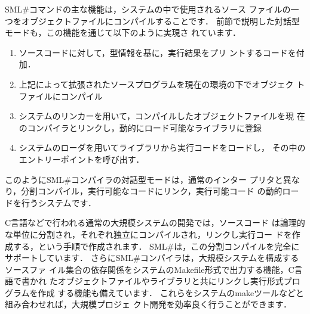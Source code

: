 \documentclass{jbook}
\newcommand{\smlsharp}{SML\#}
\begin{document}
	\smlsharp{}コマンドの主な機能は，システムの中で使用されるソース
ファイルの一つをオブジェクトファイルにコンパイルすることです．
	前節で説明した対話型モードも，この機能を通じて以下のように実現さ
れています．
\begin{enumerate}
\item ソースコードに対して，型情報を基に，実行結果をプリ
ントするコードを付加．
\item 上記によって拡張されたソースプログラムを現在の環境の下でオブジェク
トファイルにコンパイル
\item システムのリンカーを用いて，コンパイルしたオブジェクトファイルを現
在のコンパイラとリンクし，動的にロード可能なライブラリに登録
\item システムのローダを用いてライブラリから実行コードをロードし，
その中のエントリーポイントを呼び出す．
\end{enumerate}
	このように\smlsharp{}コンパイラの対話型モードは，通常のインター
プリタと異なり，分割コンパイル，実行可能なコードにリンク，実行可能コード
の動的ロードを行うシステムです．

	C言語などで行われる通常の大規模システムの開発では，ソースコード
は論理的な単位に分割され，それぞれ独立にコンパイルされ，リンクし実行コー
ドを作成する，という手順で作成されます．
	\smlsharp{}は，この分割コンパイルを完全にサポートしています．
	さらに\smlsharp{}コンパイラは，大規模システムを構成するソースファ
イル集合の依存関係をシステムのMakefile形式で出力する機能，C言語で書かれ
たオブジェクトファイルやライブラリと共にリンクし実行形式プログラムを作成
する機能も備えています．
	これらをシステムのmakeツールなどと組み合わせれば，大規模プロジェ
クト開発を効率良く行うことができます．
\end{document}

